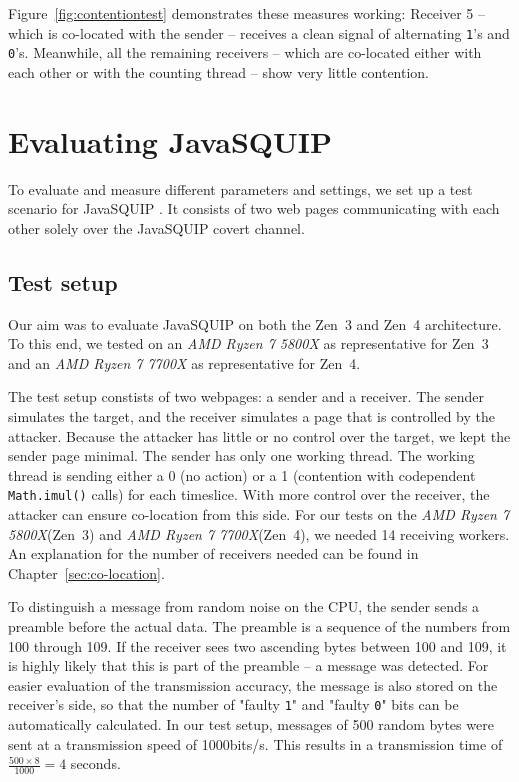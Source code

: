 \documentclass[11pt,
  titlepage=false,
]{scrreprt}
\begin{document}
Figure~\ref{fig:contentiontest} demonstrates these measures working:
Receiver 5 -- which is co-located with the sender -- receives a clean signal of alternating \texttt{1}'s and \texttt{0}'s.
Meanwhile, all the remaining receivers -- which are co-located either with each other or with the counting thread -- show very little contention.


\pagebreak
\chapter{Evaluating JavaSQUIP}
\label{ch:evaluation}

To evaluate and measure different parameters and settings, we set up a test scenario for JavaSQUIP .
It consists of two web pages communicating with each other solely over the JavaSQUIP covert channel.

\section {Test setup}
\label{sec:testsetup}
Our aim was to evaluate JavaSQUIP on both the Zen~3 and Zen~4 architecture.
To this end, we tested on an \textit{AMD Ryzen 7 5800X} as representative for Zen~3 and an \textit{AMD Ryzen 7 7700X} as representative for Zen~4.

The test setup constists of two webpages: a sender and a receiver.
The sender simulates the target, and the receiver simulates a page that is controlled by the attacker.
Because the attacker has little or no control over the target, we kept the sender page minimal.
The sender has only one working thread.
The working thread is sending either a 0 (no action) or a 1 (contention with codependent \texttt{Math.imul()} calls) for each timeslice.
With more control over the receiver, the attacker can ensure co-location from this side.
For our tests on the \textit{AMD Ryzen 7 5800X}(Zen~3) and \textit{AMD Ryzen 7 7700X}(Zen~4), we needed 14 receiving workers.
An explanation for the number of receivers needed can be found in Chapter~\ref{sec:co-location}.

To distinguish a message from random noise on the CPU, the sender sends a preamble before the actual data.
The preamble is a sequence of the numbers from 100 through 109.
If the receiver sees two ascending bytes between 100 and 109, it is highly likely that this is part of the preamble --
a message was detected.
For easier evaluation of the transmission accuracy, the message is also stored on the receiver's side,
so that the number of "faulty \texttt{1}" and "faulty \texttt{0}" bits can be automatically calculated.
In our test setup, messages of 500 random bytes were sent at a transmission speed of 1000bits/s.
This results in a transmission time of $\frac{500 \times 8}{1000} = 4$ seconds.
\end{document}
